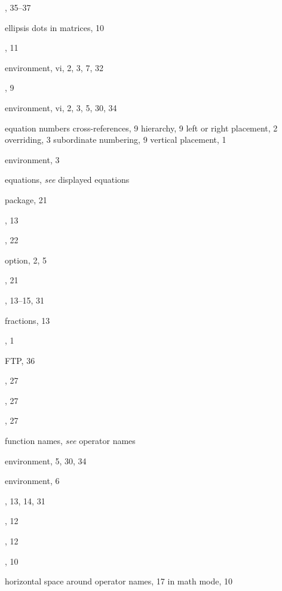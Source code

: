 \documentclass[leqno,titlepage,openany]{amsldoc}
\providecommand{\see}[2]{\textit{see} #1}
\begin{document}
\begin{theindex}
  \indexspace

  \item {}, 35--37
  \item ellipsis dots
    \subitem in matrices, 10
  \item {}, 11
  \item {} environment, vi, 2, 3, 7, 32
  \item {}, 9
  \item {} environment, vi, 2, 3, 5, 30, 34
  \item equation numbers
    \subitem cross-references, 9
    \subitem hierarchy, 9
    \subitem left or right placement, 2
    \subitem overriding, 3
    \subitem subordinate numbering, 9
    \subitem vertical placement, 1
  \item {} environment, 3
  \item equations, \see{displayed equations}{2}
  \item {} package, 21

  \indexspace

  \item {}, 13
  \item {}, 22
  \item {} option, 2, 5
  \item {}, 21
  \item {}, 13--15, 31
  \item fractions, 13
  \item {}, 1
  \item FTP, 36
  \item {}, 27
  \item {}, 27
  \item {}, 27
  \item function names, \see{operator names}{17}

  \indexspace

  \item {} environment, 5, 30, 34
  \item {} environment, 6
  \item {}, 13, 14, 31

  \indexspace

  \item {}, 12
  \item {}, 12
  \item {}, 10
  \item horizontal space
    \subitem around operator names, 17
    \subitem in math mode, 10


\end{theindex}
\end{document}
